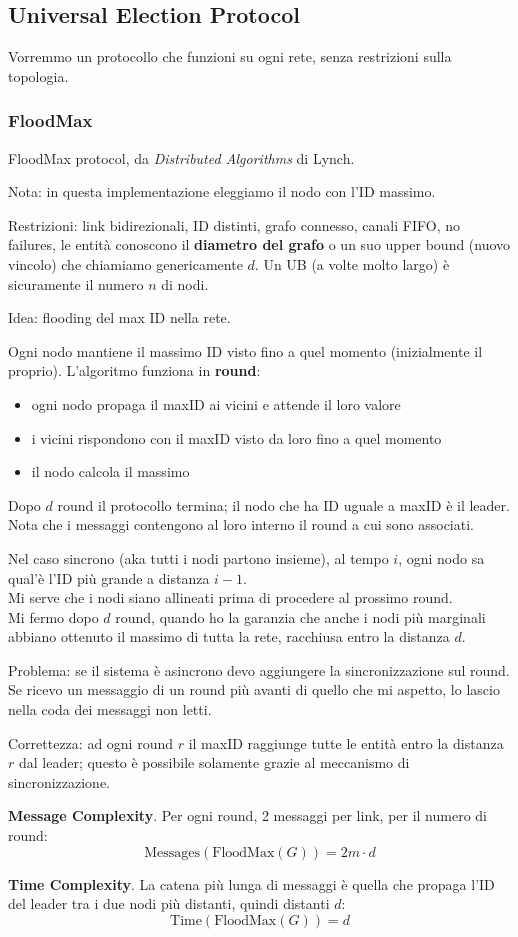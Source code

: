 \subsection{Universal Election Protocol}
Vorremmo un protocollo che funzioni su ogni rete, senza restrizioni sulla topologia.

\subsubsection{FloodMax}
FloodMax protocol, da \textit{Distributed Algorithms} di Lynch.

Nota: in questa implementazione eleggiamo il nodo con l'ID massimo.

Restrizioni: link bidirezionali, ID distinti, grafo connesso, canali FIFO, no failures, le entità conoscono il \textbf{diametro del grafo}
o un suo upper bound (nuovo vincolo) che chiamiamo genericamente $d$. Un UB (a volte molto largo) è sicuramente il numero $n$ di nodi.

Idea: flooding del max ID nella rete.

Ogni nodo mantiene il massimo ID visto fino a quel momento (inizialmente il proprio).
L'algoritmo funziona in \textbf{round}:
\begin{itemize}
  \item ogni nodo propaga il maxID ai vicini e attende il loro valore
  \item i vicini rispondono con il maxID visto da loro fino a quel momento
  \item il nodo calcola il massimo
\end{itemize}

Dopo $d$ round il protocollo termina; il nodo che ha ID uguale a maxID è il leader.
Nota che i messaggi contengono al loro interno il round a cui sono associati.

Nel caso sincrono (aka tutti i nodi partono insieme), al tempo $i$, ogni nodo sa qual'è l'ID più grande a distanza $i-1$. \\
Mi serve che i nodi siano allineati prima di procedere al prossimo round. \\
Mi fermo dopo $d$ round, quando ho la garanzia che anche i nodi più marginali abbiano ottenuto il massimo di tutta la rete,
racchiusa entro la distanza $d$.

Problema: se il sistema è asincrono devo aggiungere la sincronizzazione sul round. Se ricevo un messaggio di un round più avanti di quello
che mi aspetto, lo lascio nella coda dei messaggi non letti.

Correttezza: ad ogni round $r$ il maxID raggiunge tutte le entità entro la distanza $r$ dal leader; questo è possibile solamente grazie al
meccanismo di sincronizzazione.

\textbf{Message Complexity}.
Per ogni round, 2 messaggi per link, per il numero di round: $$ \text{Messages}(\text{FloodMax}(G)) = 2m \cdot d $$

\textbf{Time Complexity}.
La catena più lunga di messaggi è quella che propaga l'ID del leader tra i due nodi più distanti, quindi distanti $d$:
$$ \text{Time}(\text{FloodMax}(G)) = d $$